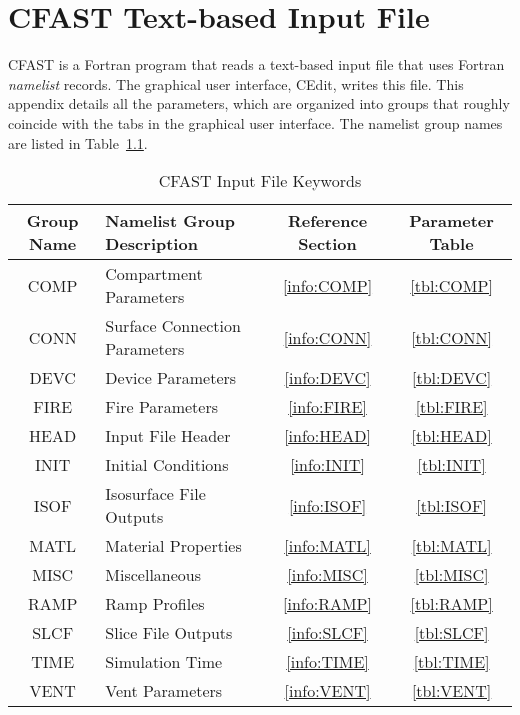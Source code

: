 \chapter{CFAST Text-based Input File}

CFAST is a Fortran program that reads a text-based input file that uses Fortran {\em namelist} records. The graphical user interface, CEdit, writes this file. This appendix details all the parameters, which are organized into groups that roughly coincide with the tabs in the graphical user interface. The namelist group names are listed in Table~\ref{tbl:namelistgroups}.

\begin{table}[ht]
\begin{center}
\caption{CFAST Input File Keywords}
\label{tbl:namelistgroups}
\begin{tabular}{|c|l|c|c|}
\hline
Group Name   & Namelist Group Description     & Reference Section & Parameter Table  \\ \hline
{\ct COMP}   & Compartment Parameters         & \ref{info:COMP}   & \ref{tbl:COMP}   \\ \hline
{\ct CONN}   & Surface Connection Parameters  & \ref{info:CONN}   & \ref{tbl:CONN}   \\ \hline
{\ct DEVC}   & Device Parameters              & \ref{info:DEVC}   & \ref{tbl:DEVC}   \\ \hline
{\ct FIRE}   & Fire Parameters                & \ref{info:FIRE}   & \ref{tbl:FIRE}   \\ \hline
{\ct HEAD}   & Input File Header              & \ref{info:HEAD}   & \ref{tbl:HEAD}   \\ \hline
{\ct INIT}   & Initial Conditions             & \ref{info:INIT}   & \ref{tbl:INIT}   \\ \hline
{\ct ISOF}   & Isosurface File Outputs        & \ref{info:ISOF}   & \ref{tbl:ISOF}   \\ \hline
{\ct MATL}   & Material Properties            & \ref{info:MATL}   & \ref{tbl:MATL}   \\ \hline
{\ct MISC}   & Miscellaneous                  & \ref{info:MISC}   & \ref{tbl:MISC}   \\ \hline
{\ct RAMP}   & Ramp Profiles                  & \ref{info:RAMP}   & \ref{tbl:RAMP}   \\ \hline
{\ct SLCF}   & Slice File Outputs             & \ref{info:SLCF}   & \ref{tbl:SLCF}   \\ \hline
{\ct TIME}   & Simulation Time                & \ref{info:TIME}   & \ref{tbl:TIME}   \\ \hline
{\ct VENT}   & Vent Parameters                & \ref{info:VENT}   & \ref{tbl:VENT}   \\ \hline
\end{tabular}
\end{center}
\end{table}

